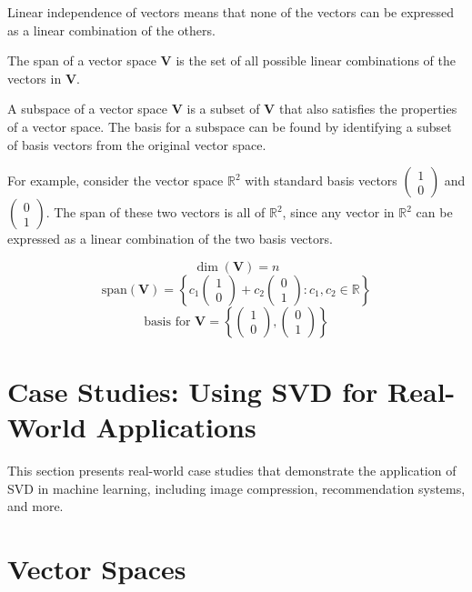 \documentclass{report}%
\begin{document}
Linear independence of vectors means that none of the vectors can be expressed as a linear combination of the others.

The span of a vector space $\mathbf{V}$ is the set of all possible linear combinations of the vectors in $\mathbf{V}$.

A subspace of a vector space $\mathbf{V}$ is a subset of $\mathbf{V}$ that also satisfies the properties of a vector space. The basis for a subspace can be found by identifying a subset of basis vectors from the original vector space.

For example, consider the vector space $\mathbb{R}^2$ with standard basis vectors $\begin{pmatrix} 1 \\ 0 \end{pmatrix}$ and $\begin{pmatrix} 0 \\ 1 \end{pmatrix}$. The span of these two vectors is all of $\mathbb{R}^2$, since any vector in $\mathbb{R}^2$ can be expressed as a linear combination of the two basis vectors.

\[
\dim(\mathbf{V}) = n
\]
\[
\text{span}(\mathbf{V}) = \left\{ c_1\begin{pmatrix} 1 \\ 0 \end{pmatrix} + c_2\begin{pmatrix} 0 \\ 1 \end{pmatrix} : c_1, c_2 \in \mathbb{R} \right\}
\]
\[
\text{basis for }\mathbf{V} = \left\{ \begin{pmatrix} 1 \\ 0 \end{pmatrix}, \begin{pmatrix} 0 \\ 1 \end{pmatrix} \right\}
\]%
\section{Case Studies: Using SVD for Real{-}World Applications}%
This section presents real-world case studies that demonstrate the application of SVD in machine learning, including image compression, recommendation systems, and more.

%
\section*{Vector Spaces}
\end{document}
